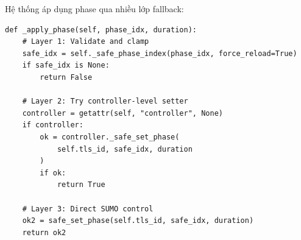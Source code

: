 \documentclass[12pt,a4paper,oneside]{report}
\begin{document}
Hệ thống áp dụng phase qua nhiều lớp fallback:

\begin{lstlisting}[style=py, caption={Hierarchical phase application}]
def _apply_phase(self, phase_idx, duration):
    # Layer 1: Validate and clamp
    safe_idx = self._safe_phase_index(phase_idx, force_reload=True)
    if safe_idx is None:
        return False
    
    # Layer 2: Try controller-level setter
    controller = getattr(self, "controller", None)
    if controller:
        ok = controller._safe_set_phase(
            self.tls_id, safe_idx, duration
        )
        if ok:
            return True
    
    # Layer 3: Direct SUMO control
    ok2 = safe_set_phase(self.tls_id, safe_idx, duration)
    return ok2
\end{lstlisting}
\end{document}
